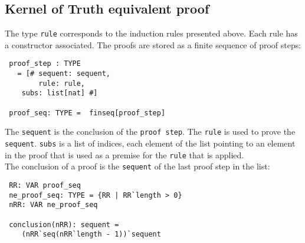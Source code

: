 \documentclass[a4paper,12pt]{article}
\begin{document}
\subsection{Kernel of Truth equivalent proof}
The type \verb|rule| corresponds to the induction rules presented above. Each rule has a constructor associated. 
The proofs are stored as a finite sequence of proof steps:
\begin{verbatim}
 proof_step : TYPE
   = [# sequent: sequent,
        rule: rule,
	subs: list[nat] #]

 proof_seq: TYPE =  finseq[proof_step]
\end{verbatim}

The \verb|sequent| is the conclusion of the \verb|proof step|. The \verb|rule| is used to prove the \verb|sequent|.
\verb|subs| is a list of indices, each element of the list pointing to an element in the proof that is used as
a premise for the \verb|rule| that is applied.
\\The conclusion of a proof is the \verb|sequent| of the last proof step in the list:
\begin{verbatim}
 RR: VAR proof_seq
 ne_proof_seq: TYPE = {RR | RR`length > 0}
 nRR: VAR ne_proof_seq

 conclusion(nRR): sequent =
    (nRR`seq(nRR`length - 1))`sequent
\end{verbatim}
\end{document}
